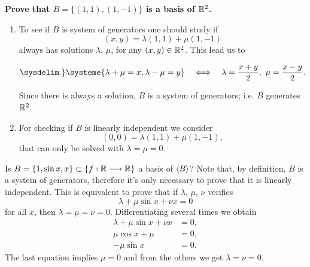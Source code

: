 \begin{example}
    \textbf{Prove that $B = \{\left( 1, 1 \right), \left( 1, -1 \right) \} $ is a basis of $\R^2$.}
    \begin{enumerate}
        \item To see if $B$ is system of generators one should study if
    \begin{equation}
        \left( x, y \right) = \lambda\left( 1, 1 \right) + \mu\left( 1, -1 \right)
    \end{equation}
    always has solutions $\lambda$, $\mu$, for any $\left( x, y \right) \in\R^2$. This lead us to

    \begin{equation}
        \sysdelim.\}\systeme{\lambda + \mu = x,\lambda - \mu = y} \quad\iff\quad \lambda = \frac{x + y}{2},\ \mu =
            \frac{x - y}{2}.
    \end{equation}

    Since there is always a solution, $B$ is a system of generators; i.e. $B$ generates $\R^2$.

    \item For checking if $B$ is linearly independent we consider
    \begin{equation}
        \left( 0, 0 \right) = \lambda\left( 1, 1 \right) + \mu\left( 1, -1 \right),
    \end{equation}
    that can only be solved with $\lambda = \mu = 0$.
    \end{enumerate}
\end{example}

\begin{example}
    Is $B = \{1, \sin x, x\}\subset \{\appl{f}{\R}{\R}\}$ a basis of $\langle B \rangle$? Note that, by definition,
    $B$ is a system of generators, therefore it's only necessary to prove that it is linearly independent.
    This is equivalent to prove that if $\lambda$, $\mu$, $\nu$ verifies
    \begin{equation}
        \lambda + \mu\sin x + \nu x = 0
    \end{equation}
    for all $x$, then $\lambda = \mu = \nu = 0$. Differentiating several times we obtain
    \begin{align}
        \lambda + \mu\sin x + \nu x &= 0, \\
        \mu\cos x + \mu &= 0, \\
        -\mu\sin x &= 0.
    \end{align}
    The last equation implies $\mu = 0$ and from the others we get $\lambda = \nu = 0$.
\end{example}

